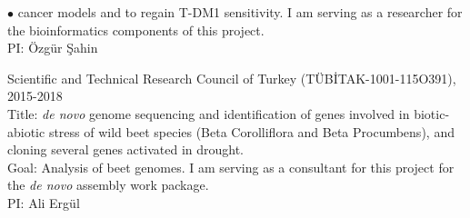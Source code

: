 \documentclass[margin,line]{res}
\newenvironment{list2}{
  \begin{list}{$\bullet$}{%
      \setlength{\itemsep}{0in}
      \setlength{\parsep}{0in} \setlength{\parskip}{0in}
      \setlength{\topsep}{0in} \setlength{\partopsep}{0in} 
      \setlength{\leftmargin}{0.2in}}}{\end{list}}
\begin{document}
\begin{resume}
\begin{list2}
                                         cancer models and to regain T-DM1 sensitivity. I am serving as a researcher 
                                         for the bioinformatics components of this project.\\
                                         PI: Özgür Şahin
                                       \item
                                         Scientific and Technical Research Council of Turkey (T\"{U}B\.{I}TAK-1001-115O391), 2015-2018\\
                                         Title: {\it de novo} genome sequencing and identification of genes involved in biotic-abiotic stress of wild beet species 
                                         (Beta Corolliflora and Beta Procumbens), and cloning several genes activated in drought.\\
                                         Goal: Analysis of beet genomes. I am serving as a consultant for this project for the {\it de novo} assembly work package.\\
                                         PI: Ali Ergül

                                       \end{list2}
               

\vspace{-0.5cm}

\end{resume}
\end{document}
